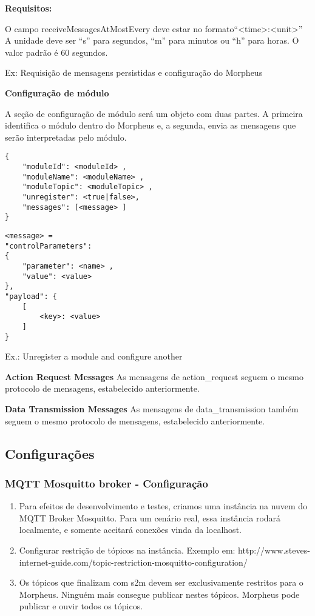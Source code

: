\textbf{Requisitos:}

O campo receiveMessagesAtMostEvery deve estar no formato“\textless time\textgreater :\textless unit\textgreater ”
A unidade deve ser “s” para segundos, “m” para minutos ou “h” para horas. O valor padrão é 60 segundos.

Ex: Requisição de mensagens persistidas e configuração do Morpheus

\textbf{Configuração de módulo}

A seção de configuração de módulo será um objeto com duas partes. A primeira identifica o módulo dentro do Morpheus e, a segunda, envia as mensagens que serão interpretadas pelo módulo.
\begin{lstlisting}
{
    "moduleId": <moduleId> ,
    "moduleName": <moduleName> ,
    "moduleTopic": <moduleTopic> ,
    "unregister": <true|false>,
    "messages": [<message> ]
}
\end{lstlisting}

\begin{lstlisting}
<message> = 
"controlParameters":
{
    "parameter": <name> ,
    "value": <value>
},
"payload": {
    [
        <key>: <value>
    ]
}
\end{lstlisting}

Ex.: Unregister a module and configure another


\textbf{Action Request Messages}
As mensagens de action\_request seguem o mesmo protocolo de mensagens, estabelecido anteriormente.

\textbf{Data Transmission Messages}
As mensagens de data\_transmission também seguem o mesmo protocolo de mensagens, estabelecido anteriormente.

\subsection{Configurações}

\subsubsection{MQTT Mosquitto broker - Configuração}

\begin{enumerate}
\item Para efeitos de desenvolvimento e testes, criamos uma instância na nuvem do MQTT Broker Mosquitto. Para um cenário real, essa instância rodará localmente, e somente aceitará conexões vinda da localhost.
\item Configurar restrição de tópicos na instância. Exemplo em: http://www.steves-internet-guide.com/topic-restriction-mosquitto-configuration/
\item Os tópicos que finalizam com s2m devem ser exclusivamente restritos para o Morpheus. Ninguém mais consegue publicar nestes tópicos. Morpheus pode publicar e ouvir todos os tópicos.
\end{enumerate}


